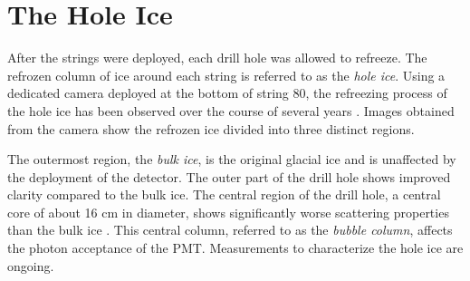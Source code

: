 \label{sec:hole_ice}
\section{The Hole Ice}
After the strings were deployed, each drill hole was allowed to refreeze. 
The refrozen column of ice around each string is referred to as the \emph{hole ice}.
Using a dedicated camera deployed at the bottom of string 80, the refreezing process of the hole ice has been observed over the course of several years \cite{IceCube-SwedishCamera, Description-IceCube}.
Images obtained from the camera show the refrozen ice divided into three distinct regions.

The outermost region, the \emph{bulk ice}, is the original glacial ice and is unaffected by the deployment of the detector.
The outer part of the drill hole shows improved clarity compared to the bulk ice.
The central region of the drill hole, a central core of about 16 cm in diameter, shows significantly worse scattering properties than the bulk ice \cite{Description-IceCube}.
This central column, referred to as the \emph{bubble column}, affects the photon acceptance of the PMT.
Measurements to characterize the hole ice are ongoing.

